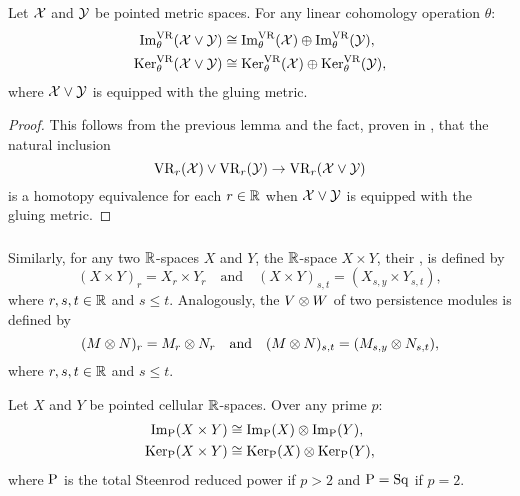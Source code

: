 \theorem
Let $\mathcal{X}$ and $\mathcal{Y}$ be pointed metric spaces.
For any linear cohomology operation $\theta$:
\begin{align*}
	\operatorname{Im}_\theta^{\mathrm{VR}}(\mathcal{X} \vee \mathcal{Y}) &\cong \operatorname{Im}_\theta^{\mathrm{VR}}(\mathcal{X}) \oplus \operatorname{Im}_\theta^{\mathrm{VR}}(\mathcal{Y}), \\
	\operatorname{Ker}_\theta^{\mathrm{VR}}(\mathcal{X} \vee \mathcal{Y}) &\cong \operatorname{Ker}_\theta^{\mathrm{VR}}(\mathcal{X}) \oplus \operatorname{Ker}_\theta^{\mathrm{VR}}(\mathcal{Y}),
\end{align*}
where \(\mathcal{X} \vee \mathcal{Y}\) is equipped with the gluing metric.

\begin{proof}
	This follows from the previous lemma and the fact, proven in \cite[Prop.~1]{adamaszek2020homotopy}, that the natural inclusion
	\[
	\mathrm{VR}_r(\mathcal{X}) \vee \mathrm{VR}_r(\mathcal{Y}) \to \mathrm{VR}_r(\mathcal{X} \vee \mathcal{Y})
	\]
	is a homotopy equivalence for each $r \in \mathbb{R}$ when \(\mathcal{X} \vee \mathcal{Y}\) is equipped with the gluing metric.
\end{proof}

\subsubsection{}\label{ss:product_general}

Similarly, for any two $\mathbb{R}$-spaces $X$ and $Y$, the $\mathbb{R}$-space $X \times Y$, their , is defined by
\[
(X \times Y)_r = X_r \times Y_r \quad\text{and}\quad (X \times Y)_{s,t} = (X_{s,y} \times Y_{s,t}),
\]
where \(r, s, t \in \mathbb{R}\) and \(s \leq t\).
Analogously, the  \(V \otimes W\) of two persistence modules is defined by
\[
(M \otimes N)_r = M_r \otimes N_r \quad\text{and}\quad (M \otimes N)_{s,t} = (M_{s,y} \otimes N_{s,t}),
\]
where \(r, s, t \in \mathbb{R}\) and \(s \leq t\).

\lemma
Let $X$ and $Y$ be pointed cellular $\mathbb{R}$-spaces.
Over any prime \(p\):
\begin{align*}
	\operatorname{Im}_{\mathrm{P}}(X \times Y) &\cong \operatorname{Im}_{\mathrm{P}}(X) \otimes \operatorname{Im}_{\mathrm{P}}(Y),\\
	\operatorname{Ker}_{\mathrm{P}}(X \times Y) &\cong \operatorname{Ker}_{\mathrm{P}}(X) \otimes \operatorname{Ker}_{\mathrm{P}}(Y),
\end{align*}
where \(\mathrm{P}\) is the total Steenrod reduced power if \(p > 2\) and \(\mathrm{P} = \mathrm{Sq}\) if \(p = 2\).

